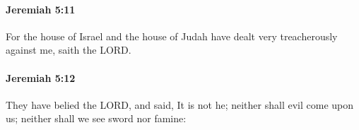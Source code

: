 		\paragraph{Jeremiah 5:11} %
			\label{JEREMIAH-5-11}

			For the house of Israel and the house of Judah have dealt very treacherously against me, saith the LORD.


		\paragraph{Jeremiah 5:12} %
			\label{JEREMIAH-5-12}

			They have belied the LORD, and said, It is not he; neither shall evil come upon us; neither shall we see sword nor famine:


